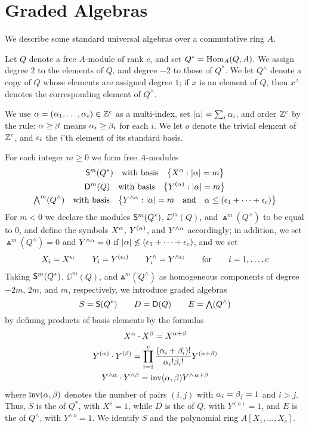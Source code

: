 \section{Graded Algebras}
\label{Graded algebras}

We describe some standard universal algebras over a commutative ring $A$.

Let $Q$ denote a free $A$-module of rank $c$, and set $Q^*=\operatorname{Hom}_A(Q,A)$.
We assign degree $2$ to the elements of $Q$, and degree $-2$ to those
of $Q^*$.  We let $Q^\wedge$ denote a copy of $Q$ whose elements are
assigned degree $1$; if $x$ is an element of $Q$, then $x^\wedge$
denotes the corresponding element of $Q^\wedge$.

We use $\alpha = (\alpha_1 , \dots , \alpha_c ) \in {\mathbb Z}^c$ as a multi-index, set
$|\alpha| = \sum_i \alpha_i$, and order ${\mathbb Z}^c$ by the rule: $\alpha \ge \beta$ means
$\alpha_i \ge \beta_i$ for each $i$.  We let $o$ denote the trivial element
of ${\mathbb Z}^c$, and $\epsilon_i$ the $i$'th element of its standard basis.

\begin{construction}
\label{algebras}
For each integer ${m}\ge0$ we form free $A$-modules
\begin{gather*}
{\mathsf S}^{m}(Q^*) \quad\text{with basis}\quad \big\{X^{\alpha} : |\alpha|={m}\big\}\\
{\mathsf D}^{m}(Q) \quad\text{with basis}\quad \big\{Y^{(\alpha)} : |\alpha|={m}\big\}\\
{\textstyle\bigwedge\limits}^{m}(Q^\wedge) \quad\text{with basis}\quad 
\big\{Y^{\wedge\alpha} : |\alpha|={m} \quad\text{and}\quad\alpha\le(\epsilon_1+\cdots+\epsilon_c)\big\}
\end{gather*}
For $m<0$ we declare the modules ${\mathsf S}^{m}(Q^*)$, $\DD^{m}(Q)$,
and $\Wedge^{m}(Q^\wedge)$ to be equal to $0$, and define the symbols
$X^{\alpha}$, $Y^{(\alpha)}$, and $Y^{\wedge\alpha}$ accordingly; in addition,
we set $\Wedge^{m}(Q^\wedge)=0$ and $Y^{\wedge\alpha}=0$ if $|\alpha|\not\le
(\epsilon_1+\cdots+\epsilon_c)$, and we set
\begin{gather*}
X_i=X^{\epsilon_i}\qquad Y_i=Y^{(\epsilon_i)}\qquad Y_i^\wedge=Y^{\wedge\epsilon_i}
\qquad\text{for}\qquad i=1,\dots,c
\end{gather*}
Taking ${\mathsf S}^{m}(Q^*)$, $\DD^{m}(Q)$, and $\Wedge{}^{m}(Q^\wedge)$ as
homogeneous components of degree $-2m$, $2m$, and $m$, respectively,
we introduce graded algebras
\[
S = {\mathsf S}(Q^*)\qquad
D = {\mathsf D}(Q)\qquad
E = {\textstyle\bigwedge\limits}(Q^\wedge)
\]
by defining products of basis elements by the formulas
\begin{gather*}
X^{\alpha}\cdot X^{\beta}=X^{\alpha+\beta}\\
Y^{(\alpha)}\cdot Y^{(\beta)}=
\prod_{i=1}^c\frac{(\alpha_i+\beta_i)!}{\alpha_i!\beta_i!}Y^{(\alpha+\beta)}\\
Y^{\wedge\alpha}\cdot Y^{\wedge\beta}={\operatorname{inv}}(\alpha,\beta)Y^{\wedge\,\alpha+\beta}
\end{gather*}
where ${\operatorname{inv}}(\alpha,\beta)$ denotes the number of pairs $(i,j)$ with
$\alpha_i=\beta_j=1$ and $i>j$.  Thus, $S$ is the {\it{}\/} of $Q^*$, with $X^{o}=1$, while $D$ is the {\it{}\/} of $Q$, with $Y^{(o)}=1$, and $E$ is the
{\it{}\/} of $Q^\wedge$, with $Y^{\wedge\,o}=1$.  We
identify $S$ and the polynomial ring $A[X_1,\dots,X_c]$.
 \end{construction}

